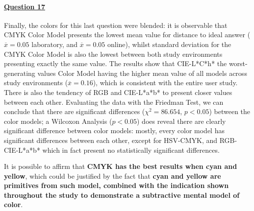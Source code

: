 \paragraph{\ul{Question 17}}
%
Finally, the colors for this last question were blended: it is observable that CMYK Color Model presents the lowest mean value for distance to ideal answer ($\overline{x} = 0.05$
laboratory, and $\overline{x} = 0.05$ online), whilst standard deviation for the CMYK Color Model is also the lowest between both study environments presenting exactly the same value.
The results show that CIE-L*C*h* the worst-generating values Color Model having the higher mean value of all models across study environments ($\overline{x} = 0.16$), which is consistent with the
entire user study. There is also the tendency of RGB and CIE-L*a*b* to present closer values between each other. Evaluating the data with the Friedman Test, we can conclude that there are significant
differences ($\chi^2 = 86.654$, $p < 0.05$) between the color models; a Wilcoxon Analysis ($p < 0.05$) does reveal there are clearly significant difference between color models: mostly, every color model
has significant differences between each other, except for HSV-CMYK, and RGB-CIE-L*a*b* which in fact present no statistically significant differences. \par
%
It is possible to affirm that \textbf{CMYK has the best results when cyan and yellow}, which could be justified by the fact that \textbf{cyan and yellow are primitives from such model, combined with the indication shown throughout the study to demonstrate a subtractive mental model of color}.
%
